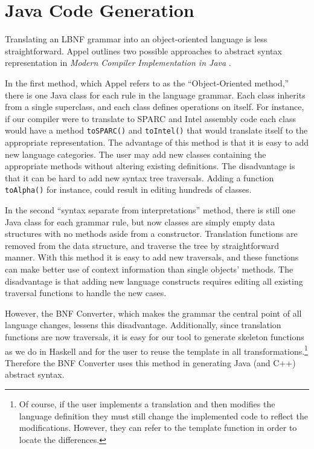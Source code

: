 \section{Java Code Generation}

Translating an LBNF grammar into an object-oriented language is less straightforward. Appel outlines two possible approaches to abstract syntax representation in \textit{Modern Compiler Implementation in Java} \cite{AppelJ}. 

In the first method, which Appel refers to as the ``Object-Oriented method,''
there is one Java class for each rule in the language grammar. Each class
inherits from a single superclass, and each class defines operations on itself.
For instance, if our compiler were to translate to SPARC and Intel assembly code
each class would have a method \texttt{toSPARC()} and \texttt{toIntel()} that would translate itself to the appropriate representation. The advantage of this method is that
it is easy to add new language categories. The user may add
new classes containing the appropriate methods without altering existing definitions. The
disadvantage is that it can be hard to add new syntax tree traversals.
Adding a function \texttt{toAlpha()} for instance, could result in editing hundreds of classes.

In the second ``syntax separate from interpretations'' method, there is still one Java class for each grammar rule, but now classes are simply empty data structures with no methods aside from a constructor. Translation functions are removed from the data structure, and traverse the tree by straightforward manner. With this method it is easy to add new traversals, and these functions can make better use of context information than single objects' methods. The disadvantage is that adding new language constructs requires editing all existing traversal functions to handle the new cases.

However, the BNF Converter, which makes the grammar the central point of all language changes, lessens this disadvantage.  Additionally, since translation functions are now traversals, it is easy for our tool to generate skeleton functions as we do in Haskell and for the user to reuse the template in all transformations.\footnote{Of course, if the user implements a translation and then modifies the language definition they must still change the implemented code to reflect the modifications. However, they can refer to the template function in order to locate the differences.} Therefore the BNF Converter uses this method in generating Java (and C++) abstract syntax.

